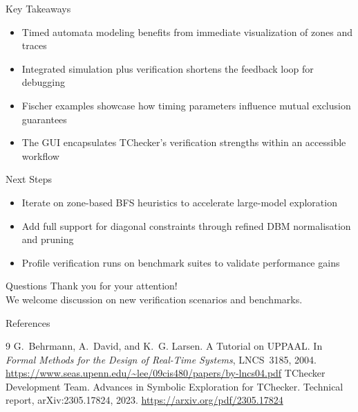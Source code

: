 \documentclass{beamer}
\begin{document}
\begin{frame}{Key Takeaways}
  \begin{itemize}
    \item Timed automata modeling benefits from immediate visualization of zones and traces
    \item Integrated simulation plus verification shortens the feedback loop for debugging
    \item Fischer examples showcase how timing parameters influence mutual exclusion guarantees
    \item The GUI encapsulates TChecker's verification strengths within an accessible workflow
  \end{itemize}
\end{frame}

\begin{frame}{Next Steps}
  \begin{itemize}
    \item Iterate on zone-based BFS heuristics to accelerate large-model exploration
    \item Add full support for diagonal constraints through refined DBM normalisation and pruning
    \item Profile verification runs on benchmark suites to validate performance gains
  \end{itemize}
\end{frame}

\begin{frame}{Questions}
  \centering
  Thank you for your attention!\\
  We welcome discussion on new verification scenarios and benchmarks.
\end{frame}

\begin{frame}{References}
  \begin{thebibliography}{9}
      G.~Behrmann, A.~David, and K.~G. Larsen.
      \newblock A Tutorial on UPPAAL.
      \newblock In \emph{Formal Methods for the Design of Real-Time Systems}, LNCS~3185, 2004.
      \newblock \url{https://www.seas.upenn.edu/~lee/09cis480/papers/by-lncs04.pdf}
      TChecker Development Team.
      \newblock Advances in Symbolic Exploration for TChecker.
      \newblock Technical report, arXiv:2305.17824, 2023.
      \newblock \url{https://arxiv.org/pdf/2305.17824}
  \end{thebibliography}
\end{frame}
\end{document}
